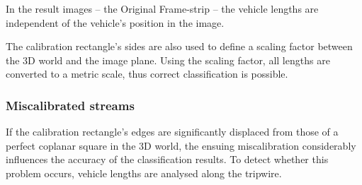 In the result images -- the Original Frame-strip -- the vehicle lengths are independent of the vehicle's position in the image. 

The calibration rectangle's sides are also used to define a scaling factor between the 3D world and the image plane.
Using the scaling factor, all lengths are converted to a metric scale, thus correct classification is possible.

\subsubsection{Miscalibrated streams}
If the calibration rectangle's edges are significantly displaced from those of a perfect coplanar square in the 3D world, the ensuing miscalibration considerably influences the accuracy of the classification results.
To detect whether this problem occurs, vehicle lengths are analysed along the tripwire.

